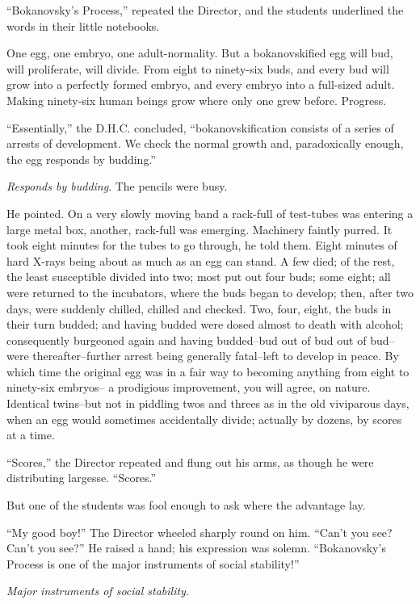 \documentclass[12pt]{report}
\begin{document}
``Bokanovsky's Process,'' repeated the Director, and the students
underlined the words in their little notebooks.

One egg, one embryo, one adult-normality. But a bokanovskified egg will
bud, will proliferate, will divide. From eight to ninety-six buds, and
every bud will grow into a perfectly formed embryo, and every embryo
into a full-sized adult. Making ninety-six human beings grow where only
one grew before. Progress.

``Essentially,'' the D.H.C. concluded, ``bokanovskification consists of
a series of arrests of development. We check the normal growth and,
paradoxically enough, the egg responds by budding.''

\emph{Responds by budding}. The pencils were busy.

He pointed. On a very slowly moving band a rack-full of test-tubes was
entering a large metal box, another, rack-full was emerging. Machinery
faintly purred. It took eight minutes for the tubes to go through, he
told them. Eight minutes of hard X-rays being about as much as an egg
can stand. A few died; of the rest, the least susceptible divided into
two; most put out four buds; some eight; all were returned to the
incubators, where the buds began to develop; then, after two days, were
suddenly chilled, chilled and checked. Two, four, eight, the buds in
their turn budded; and having budded were dosed almost to death with
alcohol; consequently burgeoned again and having budded--bud out of bud
out of bud--were thereafter--further arrest being generally fatal--left
to develop in peace. By which time the original egg was in a fair way to
becoming anything from eight to ninety-six embryos-- a prodigious
improvement, you will agree, on nature. Identical twins--but not in
piddling twos and threes as in the old viviparous days, when an egg
would sometimes accidentally divide; actually by dozens, by scores at a
time.

``Scores,'' the Director repeated and flung out his arms, as though he
were distributing largesse. ``Scores.''

But one of the students was fool enough to ask where the advantage lay.

``My good boy!'' The Director wheeled sharply round on him. ``Can't you
see? Can't you see?'' He raised a hand; his expression was solemn.
``Bokanovsky's Process is one of the major instruments of social
stability!''

\emph{Major instruments of social stability}.
\end{document}
